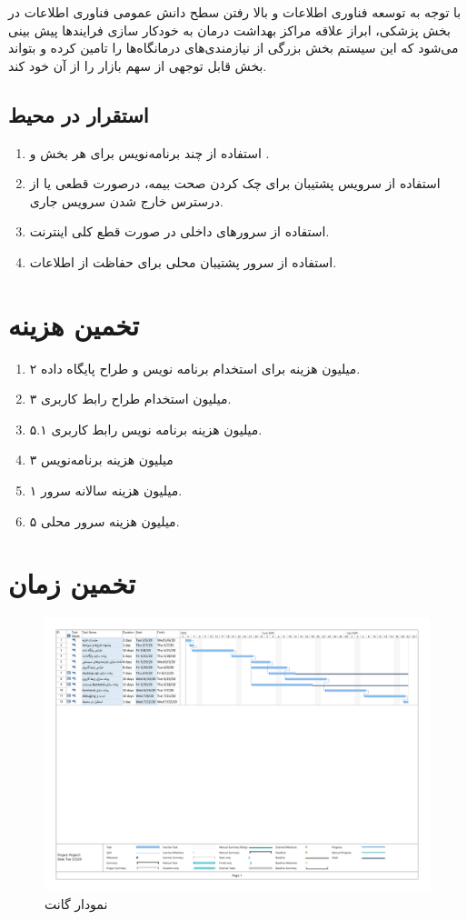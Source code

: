 \documentclass[a4paper,12pt]{article}
\begin{document}
	با توجه به توسعه فناوری اطلاعات و بالا رفتن سطح دانش عمومی فناوری اطلاعات در بخش پزشکی، ابراز علاقه مراکز بهداشت درمان به خودکار سازی فرایندها پیش بینی می‌شود که این سیستم بخش بزرگی از نیازمندی‌های درمانگاه‌ها را تامین کرده و بتواند بخش قابل توجهی از سهم بازار را از آن خود کند.
	
	\subsection{استقرار در محیط}\label{subsec2:sec3}
	\begin{enumerate}[nosep]\label{enum1:subsec2:sec3}
		\item
			استفاده از چند برنامه‌نویس برای هر بخش و 
			.
		\item
			استفاده از سرویس پشتیبان برای چک کردن صحت بیمه، درصورت قطعی یا از درسترس خارج شدن سرویس جاری.
		\item
			استفاده از سرور‌های داخلی در صورت قطع کلی اینترنت.
		\item
			استفاده از سرور پشتیبان محلی برای حفاظت از اطلاعات.
	\end{enumerate}

		
	\section{تخمین هزینه}\label{sec5}
	\begin{enumerate}[nosep]\label{enum1:sec6}
		\item 
		۲ میلیون هزینه برای استخدام برنامه نویس و طراح پایگاه داده.
		\item 
		۳ میلیون استخدام طراح رابط کاربری‌.
		\item 
		۵.۱
		 میلیون هزینه برنامه نویس رابط کاربری.
		\item
		۳ میلیون هزینه برنامه‌نویس 
		\item 
		۱ میلیون هزینه سالانه سرور.
		\item
		۵ میلیون هزینه سرور محلی.
	\end{enumerate}

	\section{تخمین زمان}\label{sec6}
	\begin{figure}[!h]
		\centering
		\includegraphics[width=.9\linewidth]{Gantchart.pdf}
		\caption{نمودار گانت}
		\label{fig1:sec6}
	\end{figure}
\end{document}

